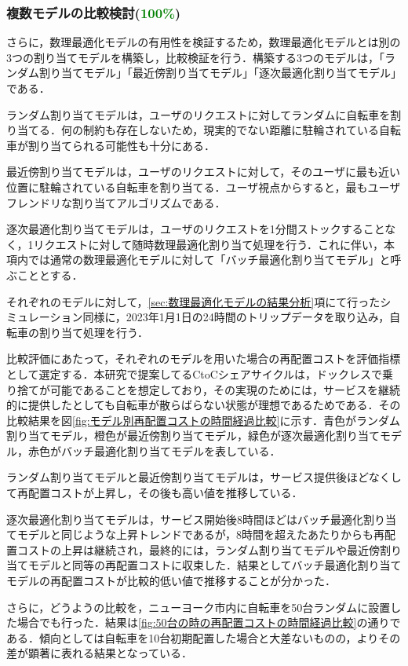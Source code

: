           
      \subsubsection{複数モデルの比較検討(\textcolor{green}{100\%})}
        \label{sec:複数モデルの比較検討}
          \par さらに，数理最適化モデルの有用性を検証するため，数理最適化モデルとは別の3つの割り当てモデルを構築し，比較検証を行う．構築する3つのモデルは，「ランダム割り当てモデル」「最近傍割り当てモデル」「逐次最適化割り当てモデル」である．
          \par ランダム割り当てモデルは，ユーザのリクエストに対してランダムに自転車を割り当てる．何の制約も存在しないため，現実的でない距離に駐輪されている自転車が割り当てられる可能性も十分にある．
          \par 最近傍割り当てモデルは，ユーザのリクエストに対して，そのユーザに最も近い位置に駐輪されている自転車を割り当てる．ユーザ視点からすると，最もユーザフレンドリな割り当てアルゴリズムである．
          \par 逐次最適化割り当てモデルは，ユーザのリクエストを1分間ストックすることなく，1リクエストに対して随時数理最適化割り当て処理を行う．これに伴い，本項内では通常の数理最適化モデルに対して「バッチ最適化割り当てモデル」と呼ぶこととする．
          \par それぞれのモデルに対して，\ref{sec:数理最適化モデルの結果分析}項にて行ったシミュレーション同様に，2023年1月1日の24時間のトリップデータを取り込み，自転車の割り当て処理を行う．
          \par 比較評価にあたって，それぞれのモデルを用いた場合の再配置コストを評価指標として選定する．本研究で提案してるCtoCシェアサイクルは，ドックレスで乗り捨てが可能であることを想定しており，その実現のためには，サービスを継続的に提供したとしても自転車が散らばらない状態が理想であるためである．その比較結果を図\ref{fig:モデル別再配置コストの時間経過比較}に示す．青色がランダム割り当てモデル，橙色が最近傍割り当てモデル，緑色が逐次最適化割り当てモデル，赤色がバッチ最適化割り当てモデルを表している．
          \par ランダム割り当てモデルと最近傍割り当てモデルは，サービス提供後ほどなくして再配置コストが上昇し，その後も高い値を推移している．
          \par 逐次最適化割り当てモデルは，サービス開始後8時間ほどはバッチ最適化割り当てモデルと同じような上昇トレンドであるが，8時間を超えたあたりからも再配置コストの上昇は継続され，最終的には，ランダム割り当てモデルや最近傍割り当てモデルと同等の再配置コストに収束した．結果としてバッチ最適化割り当てモデルの再配置コストが比較的低い値で推移することが分かった．
          \par さらに，どうようの比較を，ニューヨーク市内に自転車を50台ランダムに設置した場合でも行った．結果は\ref{fig:50台の時の再配置コストの時間経過比較}の通りである．傾向としては自転車を10台初期配置した場合と大差ないものの，よりその差が顕著に表れる結果となっている．

